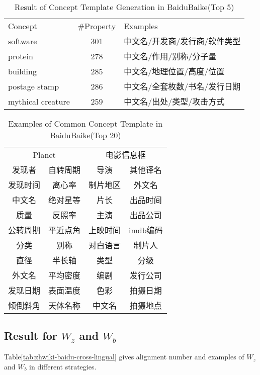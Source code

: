\documentclass[runningheads,a4paper]{llncs}
\begin{document}
\begin{table}[htb]
  \centering
  \caption{Result of Concept Template Generation in BaiduBaike(Top 5)}
  \label{tab:baidu-template-stat}
    \begin{tabular}{lcl}
         Concept & \#Property & Examples\\ 
         software      & 301  &  中文名/开发商/发行商/软件类型\\
         protein       & 278  & 中文名/作用/别称/分子量       \\
         building      & 285  & 中文名/地理位置/高度/位置     \\
         postage stamp & 286  & 中文名/全套枚数/书名/发行日期 \\
         mythical creature  & 259 & 中文名/出处/类型/攻击方式 \\
    \end{tabular}
\end{table}

\begin{table}[htb]
  \centering
  \caption{Examples of Common Concept Template in BaiduBaike(Top 20)}
  \label{tab:baidu-template-examples}
    \begin{tabular}{cccc}
         \multicolumn{2}{c}{Planet} & \multicolumn{2}{c}{电影信息框}\\ 
         发现者   &  自转周期  & 导演     & 其他译名 \\
         发现时间 &  离心率    & 制片地区 & 外文名   \\
         中文名   &  绝对星等  & 片长     & 出品时间 \\
         质量     &  反照率    & 主演     & 出品公司 \\
         公转周期 &  平近点角  & 上映时间 & imdb编码 \\
         分类     &  别称      & 对白语言 & 制片人   \\
         直径     &  半长轴    & 类型     & 分级     \\
         外文名   &  平均密度  & 编剧     & 发行公司 \\
         发现日期 &  表面温度  & 色彩     & 拍摄日期 \\
         倾倒斜角 &  天体名称  & 中文名   & 拍摄地点 \\
    \end{tabular}
\end{table}

\subsection{Result for $W_z$ and $W_b$}
Table\ref{tab:zhwiki-baidu-cross-lingual} gives alignment number and examples of $W_z$ and $W_b$ in different strategies.
\end{document}
